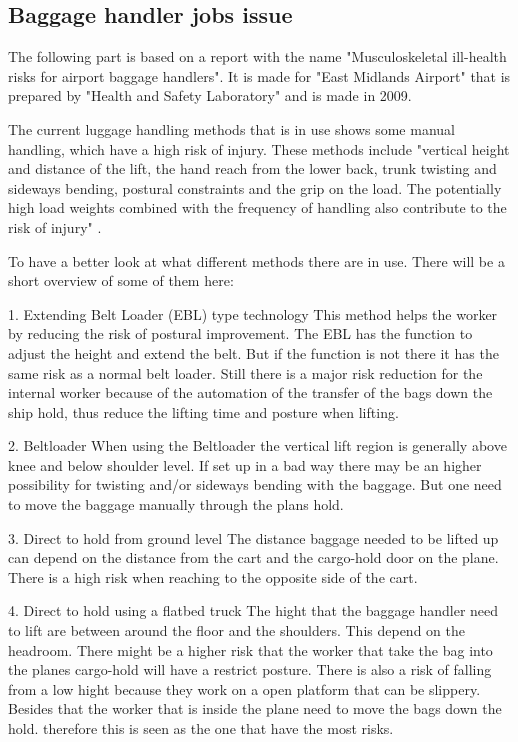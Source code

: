 \subsection{Baggage handler jobs issue}
The following part is based on a report with the name "Musculoskeletal ill-health risks for airport baggage handlers". It is made for "East Midlands Airport" that is prepared by "Health and Safety Laboratory" and is made in 2009.


The current luggage handling methods that is in use shows some manual handling, which have a high risk of injury. These methods include "vertical height and distance of the lift, the hand reach from the lower back, trunk twisting and sideways bending, postural constraints and the grip on the load. The potentially high load weights combined with the frequency of handling also contribute to the risk of injury" \citep{}.


To have a better look at what different methods there are in use. There will be a short overview of some of them here:


1. Extending Belt Loader (EBL) type technology \newline
This method helps the worker by reducing the risk of postural improvement. The EBL has the function to adjust the height and extend the belt. But if the function is not there it has the same risk as a normal belt loader. Still there is a major risk reduction for the internal worker because of the automation of the transfer of the bags down the ship hold, thus reduce the lifting time and posture when lifting.


2. Beltloader \newline
When using the Beltloader the vertical lift region is generally above knee and below shoulder level. If set up in a bad way there may be an higher possibility for twisting and/or sideways bending with the baggage. But one need to move the baggage manually through the plans hold.




3. Direct to hold from ground level \newline
The distance baggage needed to be lifted up can depend on the distance from the cart and the cargo-hold door on the plane. There is a high risk when reaching to the opposite side of the cart.

4. Direct to hold using a flatbed truck \newline
The hight that the baggage handler need to lift are between around the floor and the shoulders. This depend on the headroom. There might be a higher risk that the worker that take the bag into the planes cargo-hold will have a restrict posture. There is also a risk of falling from a low hight because they work on a open platform that can be slippery. Besides that the worker that is inside the plane need to move the bags down the hold. therefore this is seen as the one that have the most risks.